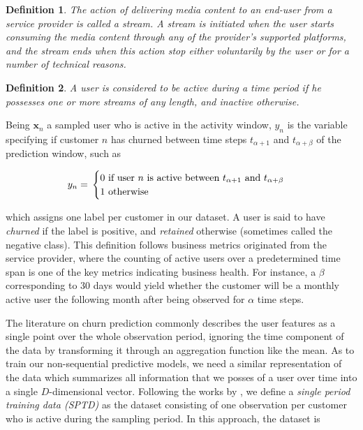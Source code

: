 \documentclass{kththesis}
\newtheorem{definition}{Definition}
\begin{document}
\begin{definition}
The action of delivering media content to an end-user from a service provider is called a \emph{stream}. A stream is initiated when the user starts consuming the media content through any of the provider's supported platforms, and the stream ends when this action stop either voluntarily by the user or for a number of technical reasons.
\end{definition}

\begin{definition}
A user is considered to be \emph{active} during a time period if he possesses one or more streams of any length, and \emph{inactive} otherwise.
\end{definition}

Being $\mathbf{x}_n$ a sampled user who is active in the activity window, $y_{n}$ is the variable specifying if customer $n$ has churned between time steps $t_{\alpha+1}$ and $t_{\alpha+\beta}$ of the prediction window, such as

\begin{equation}
y_n = \\ 
\begin{cases}
  \text{0 if user $n$ is active between $t_{\alpha+1}$ and $t_{\alpha+\beta}$} \\    
  \text{1 otherwise}    
\end{cases}
\end{equation}

which assigns one label per customer in our dataset. A user is said to have \emph{churned} if the label is positive, and \emph{retained} otherwise (sometimes called the negative class). This definition follows business metrics originated from the service provider, where the counting of active users over a predetermined time span is one of the key metrics indicating business health. For instance, a $\beta$ corresponding to 30 days would yield whether the customer will be a monthly active user the following month after being observed for $\alpha$ time steps. 

The literature on churn prediction commonly describes the user features as a single point over the whole observation period, ignoring the time component of the data by transforming it through an aggregation function like the mean. As to train our non-sequential predictive models, we need a similar representation of the data which summarizes all information that we posses of a user over time into a single $D$-dimensional vector. Following the works by \citep{GurAli2014}, we define a \emph{single period training data (SPTD)} as the dataset consisting of one observation per customer who is active during the sampling period. In this approach, the dataset is 
\end{document}
